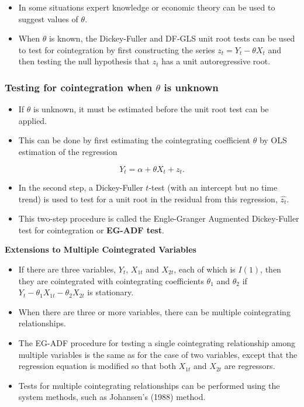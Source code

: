 \documentclass[]{book}
\providecommand{\tightlist}{%
  \setlength{\itemsep}{0pt}\setlength{\parskip}{0pt}}
\begin{document}
\begin{itemize}
\tightlist
\item
  In some situations expert knowledge or economic theory can be used to suggest values of \(\theta\).
\item
  When \(\theta\) is known, the Dickey-Fuller and DF-GLS unit root tests can be used to test for cointegration by first constructing the series \(z_t=Y_t-\theta X_t\) and then testing the null hypothesis that \(z_t\) has a unit autoregressive root.
\end{itemize}

\hypertarget{testing-for-cointegration-when-theta-is-unknown}{%
\subsubsection{\texorpdfstring{Testing for cointegration when \(\theta\) is unknown}{Testing for cointegration when \textbackslash{}theta is unknown}}\label{testing-for-cointegration-when-theta-is-unknown}}

\begin{itemize}
\tightlist
\item
  If \(\theta\) is unknown, it must be estimated before the unit root test can be applied.
\item
  This can be done by first estimating the cointegrating coefficient \(\theta\) by OLS estimation of the regression
\end{itemize}

\[Y_t = \alpha+\theta X_t+z_t.\]

\begin{itemize}
\tightlist
\item
  In the second step, a Dickey-Fuller \(t\)-test (with an intercept but no time trend) is used to test for a unit root in the residual from this regression, \(\hat{z_t}.\)
\item
  This two-step procedure is called the Engle-Granger Augmented Dickey-Fuller test for cointegration or \textbf{EG-ADF test}.
\end{itemize}

\textbf{Extensions to Multiple Cointegrated Variables}

\begin{itemize}
\tightlist
\item
  If there are three variables, \(Y_t\), \(X_{1t}\) and \(X_{2t}\), each of which is \(I(1)\), then they are cointegrated with cointegrating coefficients \(\theta_1\) and \(\theta_2\) if \(Y_t-\theta_1 X_{1t} -\theta_2X_{2t}\) is stationary.
\item
  When there are three or more variables, there can be multiple cointegrating relationships.
\item
  The EG-ADF procedure for testing a single cointegrating relationship among multiple variables is the same as for the case of two variables, except that the regression equation is modified so that both \(X_{1t}\) and \(X_{2t}\) are regressors.
\item
  Tests for multiple cointegrating relationships can be performed using the system methods, such as Johansen's (1988) method.
\end{itemize}
\end{document}

